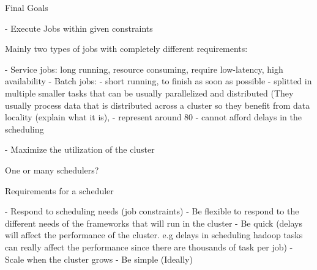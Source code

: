 
Final Goals


  - Execute Jobs within given constraints

    Mainly two types of jobs with completely different requirements:

    - Service jobs: long running, resource consuming, require low-latency, high availability
    - Batch jobs: 
      - short running, to finish as soon as possible 
      - splitted in multiple smaller tasks that can be usually parallelized and distributed 
      (They usually process data that is distributed across a cluster so they benefit from 
      data locality (explain what it is), 
      - represent around 80%
      - cannot afford delays in the scheduling

  - Maximize the utilization of the cluster

One or many schedulers?

Requirements for a scheduler

  - Respond to scheduling needs (job constraints)
  - Be flexible to respond to the different needs of the frameworks that will run in the
    cluster
  - Be quick (delays will affect the performance of the cluster. e.g delays in scheduling
    hadoop tasks can really affect the performance since there are thousands of task per job)
  - Scale when the cluster grows
  - Be simple (Ideally)



